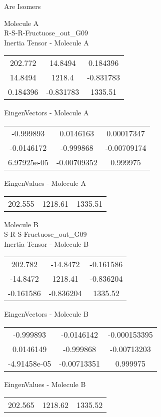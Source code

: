 \begin{center}
\vtab
\vtab
\textcolor{NavyBlue}{\Large Are Isomers}
\end{center}
\newpage
\begin{multicols}{2}
\begin{center}
Molecule A \\ 
R-S-R-Fructuose\_out\_G09
\\
Inertia Tensor - Molecule A \\
\vtab
\begin{tabular}{|c c c|}
202.772	 & 	14.8494	 & 	0.184396	 \\
14.8494	 & 	1218.4	 & 	-0.831783	 \\
0.184396	 & 	-0.831783	 & 	1335.51
\end{tabular}

\vtab
 EingenVectors - Molecule A     \\
\vtab
\begin{tabular}{|c c c|}
-0.999893	 & 	0.0146163	 & 	0.00017347	 \\
-0.0146172	 & 	-0.999868	 & 	-0.00709174	 \\
6.97925e-05	 & 	-0.00709352	 & 	0.999975
\end{tabular}

\vtab
 EingenValues - Molecule A     \\
\vtab
\begin{tabular}{|c c c|}
202.555	 & 	1218.61	 & 	1335.51
\end{tabular}
\columnbreak

Molecule B \\ 
S-R-S-Fructuose\_out\_G09
\\
Inertia Tensor - Molecule B \\
\vtab
\begin{tabular}{|c c c|}
202.782	 & 	-14.8472	 & 	-0.161586	 \\
-14.8472	 & 	1218.41	 & 	-0.836204	 \\
-0.161586	 & 	-0.836204	 & 	1335.52
\end{tabular}

\vtab
 EingenVectors - Molecule B     \\
\vtab
\begin{tabular}{|c c c|}
-0.999893	 & 	-0.0146142	 & 	-0.000153395	 \\
0.0146149	 & 	-0.999868	 & 	-0.00713203	 \\
-4.91458e-05	 & 	-0.00713351	 & 	0.999975
\end{tabular}

\vtab
 EingenValues - Molecule B     \\
\vtab
\begin{tabular}{|c c c|}
202.565	 & 	1218.62	 & 	1335.52
\end{tabular}

\end{center}
\end{multicols}
